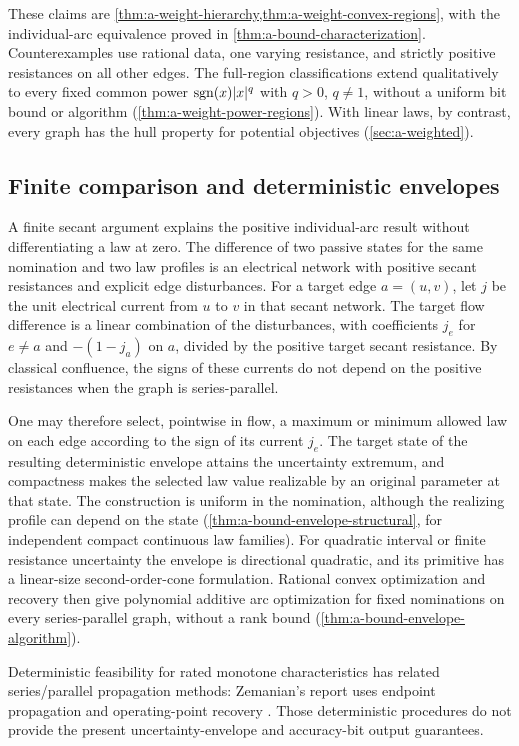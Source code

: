 These claims are \cref{thm:a-weight-hierarchy,thm:a-weight-convex-regions},
with the individual-arc equivalence proved in
\cref{thm:a-bound-characterization}. Counterexamples use rational data,
one varying resistance, and strictly positive resistances on all other
edges. The full-region
classifications extend qualitatively to every fixed common power
$\operatorname{sgn}(x)|x|^q$ with $q>0$, $q\ne1$, without a uniform bit bound or
algorithm (\cref{thm:a-weight-power-regions}). With linear laws, by
contrast, every graph has the hull property for potential objectives
(\cref{sec:a-weighted}).

\subsection{Finite comparison and deterministic envelopes}

A finite secant argument explains the positive individual-arc result
without differentiating a law at zero. The difference of two passive
states for the same nomination and two law profiles is an electrical
network with positive secant resistances and explicit edge disturbances.
For a target edge $a=(u,v)$, let $j$ be the unit electrical current from
$u$ to $v$ in that secant network. The target flow difference is a
linear combination of the disturbances, with coefficients $j_e$ for
$e\ne a$ and $-(1-j_a)$ on $a$, divided by the positive target secant
resistance. By classical confluence, the signs of these currents do not
depend on the positive resistances when the graph is series-parallel.

One may therefore select, pointwise in flow, a maximum or minimum
allowed law on each edge according to the sign of its current $j_e$. The target
state of the resulting deterministic envelope attains the uncertainty
extremum, and compactness makes the selected law value realizable by an
original parameter at that state. The construction is uniform in the
nomination, although the realizing profile can depend on the state
(\cref{thm:a-bound-envelope-structural}, for independent compact
continuous law families). For quadratic interval or finite resistance
uncertainty the envelope is directional quadratic, and its primitive
has a linear-size second-order-cone formulation. Rational convex
optimization and recovery then give polynomial additive arc optimization
for fixed nominations on every series-parallel graph, without a rank
bound (\cref{thm:a-bound-envelope-algorithm}).

Deterministic feasibility for rated monotone characteristics has related
series/parallel propagation methods: Zemanian's report uses endpoint
propagation and operating-point recovery
\citep[Conditions 2.1, Lemmas 4.1 and 5.1, Procedure 8.1]{zemanian1999-ratings}.
Those deterministic procedures do not provide the present
uncertainty-envelope and accuracy-bit output guarantees.

